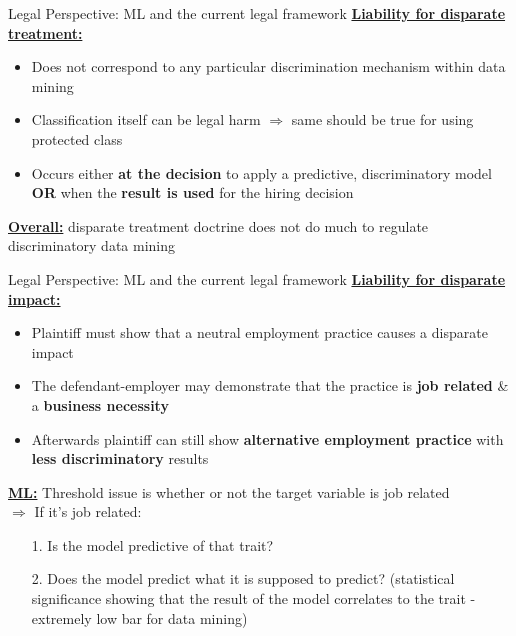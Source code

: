 \begin{frame}{Legal Perspective: ML and the current legal framework \cite{Barocas.2016}}
\underline{\textbf{Liability for disparate treatment:}}\\

\begin{itemize}
    \item Does not correspond to any particular discrimination mechanism within data mining
    \item Classification itself can be legal harm $\Rightarrow$ same should be true for using protected class
    \item Occurs either \textbf{at the decision} to apply a predictive, discriminatory model \textbf{OR} when the \textbf{result is used} for the hiring decision
\end{itemize}
\vspace{1cm}
\underline{\textbf{Overall:}} disparate treatment doctrine does not do much to regulate discriminatory data mining
\end{frame}

\begin{frame}{Legal Perspective: ML and the current legal framework \cite{Barocas.2016}}
\underline{\textbf{Liability for disparate impact:}}\\

\begin{itemize}
    \item Plaintiff must show that a neutral employment practice causes a disparate impact
    \item The defendant-employer may demonstrate that the practice is \textbf{job related} \& a \textbf{business necessity}
    \item Afterwards plaintiff can still show \textbf{alternative employment practice} with \textbf{less discriminatory} results
\end{itemize}
\underline{\textbf{ML:}} Threshold issue is whether or not the target variable is job related\\
\vspace{0.5cm}
$\Rightarrow$ If it's job related: 
\begin{itemize}
    \item[1.] Is the model predictive of that trait?
    \item[2.] Does the model predict what it is supposed to predict? (statistical significance showing that the result of the model correlates to the trait - extremely low bar for data mining)
\end{itemize}
\end{frame}


